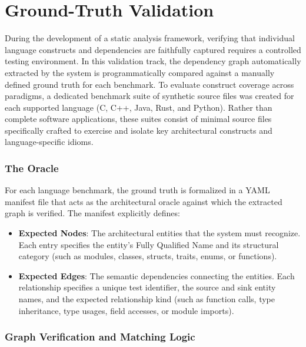 \section{Ground-Truth Validation}
\label{sec:ground_truth_methodology}

During the development of a static analysis framework, verifying that
individual language constructs and dependencies are faithfully
captured requires a controlled testing environment. In this
validation track, the dependency graph automatically extracted by the
system is programmatically compared against a manually defined ground
truth for each benchmark. To evaluate construct coverage across
paradigms, a dedicated benchmark suite of synthetic source files was
created for each supported language (C, C++, Java, Rust, and Python).
Rather than complete software applications, these suites consist of
minimal source files specifically crafted to exercise and isolate
key architectural constructs and language-specific idioms.

\subsubsection{The Oracle}
\label{subsec:micro_benchmarks}

For each language benchmark, the ground truth is formalized in a YAML
manifest file that acts as the architectural oracle against which the
extracted graph is verified. The manifest explicitly defines:
\begin{itemize}
  \item \textbf{Expected Nodes}: The architectural entities that the
    system must recognize. Each entry specifies the entity's Fully
    Qualified Name and its structural category (such as modules,
    classes, structs, traits, enums, or functions).
  \item \textbf{Expected Edges}: The semantic dependencies connecting
    the entities. Each relationship specifies a unique test
    identifier, the source and sink entity names, and the expected
    relationship kind (such as function calls, type inheritance, type
    usages, field accesses, or module imports).
\end{itemize}

\subsubsection{Graph Verification and Matching Logic}
\label{subsec:graph_verification_logic}

